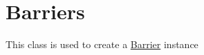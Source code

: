\hypertarget{index_Barriers}{}\section{Barriers}\label{index_Barriers}
This class is used to create a \hyperlink{classBarrier}{Barrier} instance 